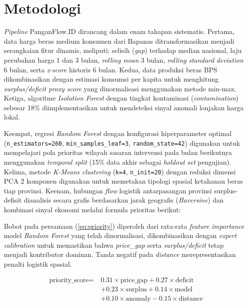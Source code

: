 \documentclass[journal, a4paper]{IEEEtran}
\begin{document}
\section{Metodologi}
\textit{Pipeline} PanganFlow.ID dirancang dalam enam tahapan sistematis. Pertama, data harga beras medium konsumen dari Bapanas \cite{15} ditransformasikan menjadi serangkaian fitur dinamis, meliputi: selisih (\textit{gap}) terhadap median nasional, laju perubahan harga 1 dan 3 bulan, \textit{rolling mean} 3 bulan, \textit{rolling standard deviation} 6 bulan, serta \textit{z-score} historis 6 bulan. Kedua, data produksi beras BPS \cite{16} dikombinasikan dengan estimasi konsumsi per kapita \cite{17} untuk menghitung \textit{surplus/deficit proxy score} yang dinormalisasi menggunakan metode min-max. Ketiga, algoritme \textit{Isolation Forest} \cite{12} dengan tingkat kontaminasi (\textit{contamination}) sebesar 18\% diimplementasikan untuk mendeteksi sinyal anomali lonjakan harga lokal.

Keempat, regresi \textit{Random Forest} \cite{11} dengan konfigurasi hiperparameter optimal (\texttt{n\_estimators=260}, \texttt{min\_samples\_leaf=3}, \texttt{random\_state=42}) digunakan untuk mempelajari pola prioritas wilayah sasaran intervensi pada bulan berikutnya menggunakan \textit{temporal split} (15\% data akhir sebagai \textit{holdout set} pengujian). Kelima, metode \textit{K-Means clustering} \cite{13} (\texttt{k=4}, \texttt{n\_init=20}) dengan reduksi dimensi PCA 2 komponen digunakan untuk memetakan tipologi spasial ketahanan beras tiap provinsi. Keenam, hubungan \textit{flow} logistik antarpasangan provinsi surplus-defisit dianalisis secara grafis berdasarkan jarak geografis (\textit{Haversine}) dan kombinasi sinyal ekonomi melalui formula prioritas berikut:

Bobot pada persamaan (\ref{eq:priority}) diperoleh dari rata-rata \textit{feature importance} model \textit{Random Forest} yang telah dinormalisasi, dikombinasikan dengan \textit{expert calibration} untuk memastikan bahwa \textit{price\_gap} serta \textit{surplus/deficit} tetap menjadi kontributor dominan. Tanda negatif pada \textit{distance} merepresentasikan penalti logistik spasial.

\begin{equation}
\label{eq:priority}
\begin{aligned}
\text{priority\_score} =\ & 0.31 \times \text{price\_gap} + 0.27 \times \text{deficit} \\
& + 0.23 \times \text{surplus} + 0.14 \times \text{model} \\
& + 0.10 \times \text{anomaly} - 0.15 \times \text{distance}
\end{aligned}
\end{equation}
\end{document}
